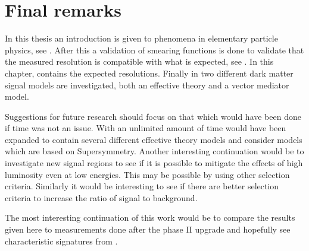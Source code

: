 \chapter{Final remarks}\label{cha:res}
In this thesis an introduction is given to phenomena in elementary particle 
\\physics, see . After this a validation of smearing functions is done to validate that the measured resolution is compatible with what is expected, see . In this chapter,  contains the expected resolutions. Finally in  two different dark matter signal models are investigated, both an effective theory and a vector mediator model.

Suggestions for future research should focus on that which would have been done if time was not an issue. With an unlimited amount of time  would have been expanded to contain several different effective theory models and consider models which are based on Supersymmetry. Another interesting continuation would be to investigate new signal regions to see if it is possible to mitigate the effects of high luminosity even at low energies. This may be possible by using other selection criteria. Similarly it would be interesting to see if there are better selection criteria to increase the ratio of signal to background.  

The most interesting continuation of this work would be to compare the results given here to measurements done after the phase II upgrade and hopefully see characteristic signatures from \abbrWIMPS .
